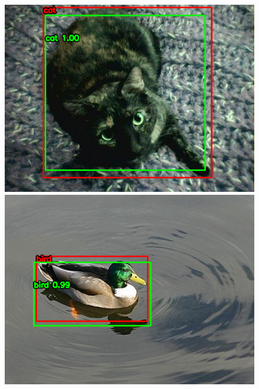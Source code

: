 \documentclass{article}
\begin{document}
\begin{figure}[htbp]
  \centering
  \begin{minipage}{0.24\textwidth}
      \centering
      \includegraphics[width=\linewidth]{results_lg/cat_0.png}
  \end{minipage}
  \begin{minipage}{0.24\textwidth}
      \centering
      \includegraphics[width=\linewidth]{results_lg/bird_57.png}
  \end{minipage}
  \begin{minipage}{0.24\textwidth}
      \centering

\end{minipage}
\end{figure}
\end{document}

